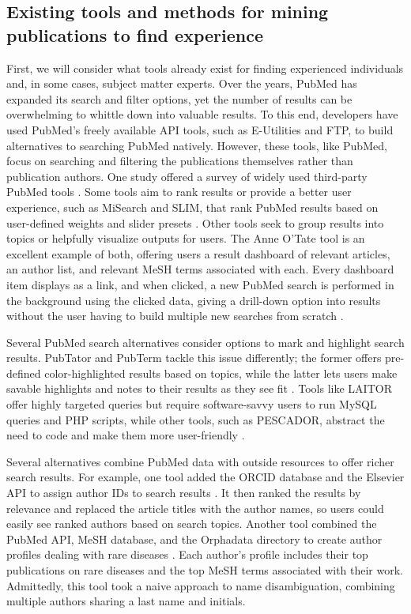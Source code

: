 \subsection{Existing tools and methods for mining publications to find experience}

First, we will consider what tools already exist for finding experienced individuals and, in some cases, subject matter experts. Over the years, PubMed has expanded its search and filter options, yet the number of results can be overwhelming to whittle down into valuable results. To this end, developers have used PubMed’s freely available API tools, such as E-Utilities and FTP, to build alternatives to searching PubMed natively. However, these tools, like PubMed, focus on searching and filtering the publications themselves rather than publication authors. One study offered a survey of widely used third-party PubMed tools \cite{ref-pubmed-tools}. Some tools aim to rank results or provide a better user experience, such as MiSearch and SLIM, that rank PubMed results based on user-defined weights and slider presets \cite{ref-pubmed-misearch}. Other tools seek to group results into topics or helpfully visualize outputs for users. The Anne O’Tate tool is an excellent example of both, offering users a result dashboard of relevant articles, an author list, and relevant MeSH terms associated with each. Every dashboard item displays as a link, and when clicked, a new PubMed search is performed in the background using the clicked data, giving a drill-down option into results without the user having to build multiple new searches from scratch \cite{ref-pubmed-anne-otate}. 

Several PubMed search alternatives consider options to mark and highlight search results. PubTator and PubTerm tackle this issue differently; the former offers pre-defined color-highlighted results based on topics, while the latter lets users make savable highlights and notes to their results as they see fit \cite{ref-pubmed-pubterm, ref-pubmed-pubtator}. Tools like LAITOR offer highly targeted queries but require software-savvy users to run MySQL queries and PHP scripts, while other tools, such as PESCADOR, abstract the need to code and make them more user-friendly \cite{ref-pubmed-pescador}.

Several alternatives combine PubMed data with outside resources to offer richer search results. For example, one tool added the ORCID database and the Elsevier API to assign author IDs to search results \cite{ref-pubmed-pmsc}. It then ranked the results by relevance and replaced the article titles with the author names, so users could easily see ranked authors based on search topics. Another tool combined the PubMed API, MeSH database, and the Orphadata directory to create author profiles dealing with rare diseases \cite{ref-pubmed-bibiometric}. Each author’s profile includes their top publications on rare diseases and the top MeSH terms associated with their work. Admittedly, this tool took a naive approach to name disambiguation, combining multiple authors sharing a last name and initials.


